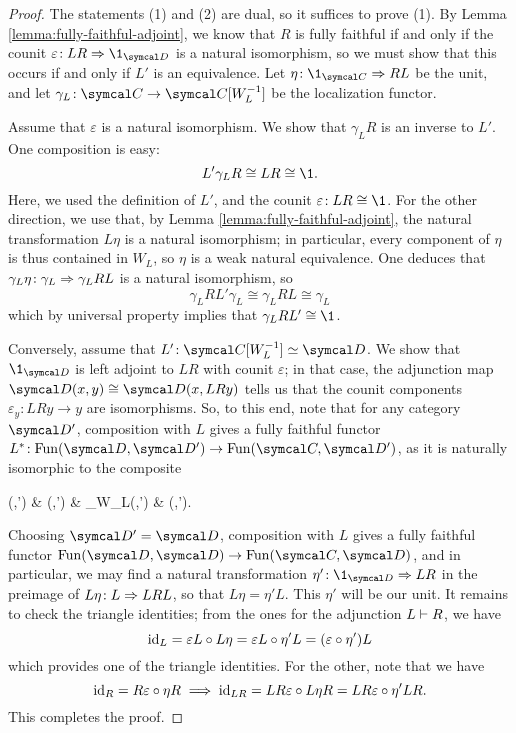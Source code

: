 \begin{proof}
The statements (1) and (2) are dual, so it suffices to prove (1). By Lemma \ref{lemma:fully-faithful-adjoint}, we know that \(R\) is fully faithful if and only if the counit
\(\varepsilon\!:LR\To\1_{\calD}\) is a natural isomorphism, so we must show that this occurs if and only if \(L'\) is an equivalence. Let \(\eta\!:\1_{\calC}\To RL\) be the unit,
and let \(\gamma_L\!:\calC\to\calC[W_L^{-1}]\) be the localization functor.

Assume that \(\varepsilon\) is a natural isomorphism. We show that \(\gamma_L R\) is an inverse to \(L'\). One composition is easy:
\[ L'\gamma_L R \cong LR \cong \1. \]
Here, we used the definition of \(L'\), and the counit \(\varepsilon\!:LR\cong\1\). For the other direction, we use that, by Lemma \ref{lemma:fully-faithful-adjoint}, the
natural transformation \(L\eta\) is a natural isomorphism; in particular, every component of \(\eta\) is thus contained in \(W_L\), so \(\eta\) is a weak natural equivalence.
One deduces that \(\gamma_L\eta\!:\gamma_L\Rightarrow\gamma_L RL\) is a natural isomorphism, so
\[ \gamma_L RL'\gamma_L \cong \gamma_L RL \cong \gamma_L \]
which by universal property implies that \(\gamma_L R L'\cong\1\).

Conversely, assume that \(L'\!:\calC[W_L^{-1}]\simeq\calD\). We show that \(\1_{\calD}\) is left adjoint to \(LR\) with counit \(\varepsilon\); in that case, the adjunction map \(\calD(x,y)\cong\calD(x,LRy)\)
tells us that the counit components \(\varepsilon_y\!: LRy\to y\) are isomorphisms. So, to this end, note that for any category \(\calD'\), composition with \(L\)
gives a fully faithful functor \(L^*\!:\Fun(\calD,\calD')\to\Fun(\calC,\calD')\), as it is naturally isomorphic to the composite
\begin{diagram*}
	\Fun(\calD,\calD')  & \Fun(\calC[W_L^{-1}],\calD')  & \Fun_{W_L}(\calC,\calD') \ar[r,hook] & \Fun(\calC,\calD').
\end{diagram*}
Choosing \(\calD' = \calD\), composition with \(L\) gives a fully faithful functor \(\Fun(\calD,\calD)\to\Fun(\calC,\calD)\), and in particular, we may find a natural
transformation \(\eta'\!:\1_{\calD}\To LR\) in the preimage of \(L\eta\!:L\Rightarrow LRL\), so that \(L\eta = \eta'L\). This \(\eta'\) will be our unit. It remains
to check the triangle identities; from the ones for the adjunction \(L \vdash R\), we have
\[ \mathrm{id}_L = \varepsilon L\circ L\eta = \varepsilon L \circ \eta'L = (\varepsilon\circ\eta')L \]
which provides one of the triangle identities. For the other, note that we have
\[ \mathrm{id}_R = R\varepsilon\circ\eta R \implies \mathrm{id}_{LR} = LR\varepsilon\circ L\eta R = LR\varepsilon\circ\eta'LR. \]
This completes the proof.
\end{proof}
